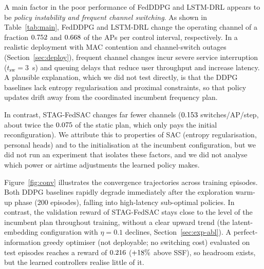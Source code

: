 A main factor in the poor performance of FedDDPG and LSTM-DRL appears to be \emph{policy instability and frequent channel switching}. As shown in Table~\ref{tab:main}, FedDDPG and LSTM-DRL change the operating channel of a fraction $0.752$ and $0.668$ of the APs per control interval, respectively. In a realistic deployment with MAC contention and channel-switch outages (Section~\ref{sec:deploy}), frequent channel changes incur severe service interruption ($t_{\mathrm{sw}}=3$~s) and queuing delays that reduce user throughput and increase latency. A plausible explanation, which we did not test directly, is that the DDPG baselines lack entropy regularisation and proximal constraints, so that policy updates drift away from the coordinated incumbent frequency plan. 

In contrast, STAG-FedSAC changes far fewer channels ($0.153$ switches/AP/step, about twice the $0.075$ of the static plan, which only pays the initial reconfiguration). We attribute this to properties of SAC (entropy regularisation, personal heads) and to the initialisation at the incumbent configuration, but we did not run an experiment that isolates these factors, and we did not analyse which power or airtime adjustments the learned policy makes.

Figure~\ref{fig:conv} illustrates the convergence trajectories across training episodes. Both DDPG baselines rapidly degrade immediately after the exploration warm-up phase ($200$ episodes), falling into high-latency sub-optimal policies. In contrast, the validation reward of STAG-FedSAC stays close to the level of the incumbent plan throughout training, without a clear upward trend (the latent-embedding configuration with $\eta=0.1$ declines, Section~\ref{sec:exp-abl}). A perfect-information greedy optimiser (not deployable; no switching cost) evaluated on test episodes reaches a reward of $0.216$ ($+18\%$ above SSF), so headroom exists, but the learned controllers realise little of it.
